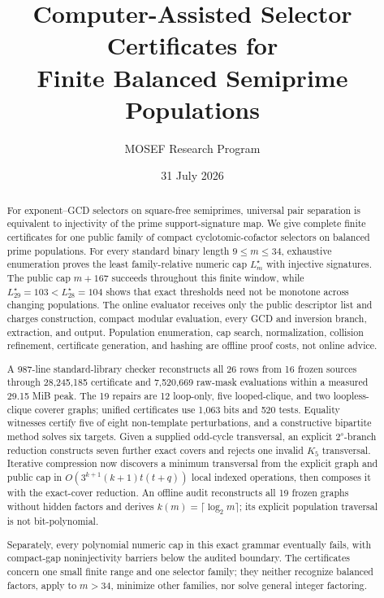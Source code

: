 \documentclass[11pt]{article}
\title{Computer-Assisted Selector Certificates for\\
Finite Balanced Semiprime Populations}
\author{MOSEF Research Program}
\date{31 July 2026}
\begin{document}
\maketitle

\begin{abstract}
For exponent--GCD selectors on square-free semiprimes, universal pair
separation is equivalent to injectivity of the prime support-signature map.
We give complete finite certificates for one public family of compact
cyclotomic-cofactor selectors on balanced prime populations.  For every
standard binary length \(9\le m\le34\), exhaustive enumeration proves the
least family-relative numeric cap \(L_m^\star\) with injective signatures.
The public cap \(m+167\) succeeds throughout this finite window, while
\(L_{29}^\star=103<L_{28}^\star=104\) shows that exact thresholds need not be
monotone across changing populations.  The online evaluator receives only
the public descriptor list and charges construction, compact modular
evaluation, every GCD and inversion branch, extraction, and output.
Population enumeration, cap search, normalization, collision refinement,
certificate generation, and hashing are offline proof costs, not online
advice.

A 987-line standard-library checker reconstructs all 26 rows from 16 frozen
sources through 28,245,185 certificate and 7,520,669 raw-mask evaluations
within a measured 29.15 MiB peak.  The 19 repairs are 12 loop-only, five
looped-clique, and two loopless-clique coverer graphs; unified certificates
use 1,063 bits and 520 tests.  Equality witnesses certify five of eight
non-template perturbations, and a constructive bipartite method solves six
targets.  Given a supplied odd-cycle transversal, an explicit \(2^s\)-branch
reduction constructs seven further exact covers and rejects one invalid
\(K_5\) transversal.  Iterative compression now discovers a minimum
transversal from the explicit graph and public cap in
\(O(3^{k+1}(k+1)t(t+q))\) local indexed operations, then composes it with
the exact-cover reduction.  An offline audit reconstructs all 19 frozen
graphs without hidden factors and derives \(k(m)=\lceil\log_2m\rceil\);
its explicit population traversal is not bit-polynomial.

Separately, every polynomial numeric cap in this exact grammar eventually
fails, with compact-gap noninjectivity barriers below the audited boundary.
The certificates concern one small finite range and one selector family;
they neither recognize balanced factors, apply to \(m>34\), minimize other
families, nor solve general integer factoring.
\end{abstract}
\end{document}
